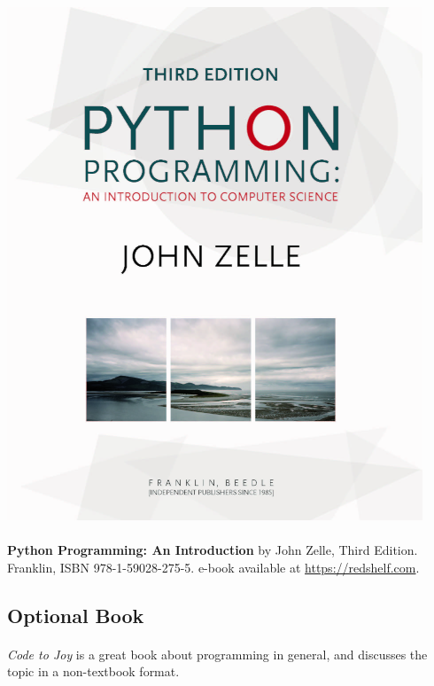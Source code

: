 \documentclass[letter,10pt]{article}
\begin{document}
\includegraphics[scale=0.7]{Images/PythonThirdFrontCover}

\paragraph{}\textbf{Python Programming: An Introduction} by John Zelle, Third Edition. Franklin, ISBN 978-1-59028-275-5. e-book available at \url{https://redshelf.com}.

\subsection*{Optional Book}
\paragraph{}\textit{Code to Joy} is a great book about programming in general, and discusses the topic in a non-textbook format. 
\end{document}

